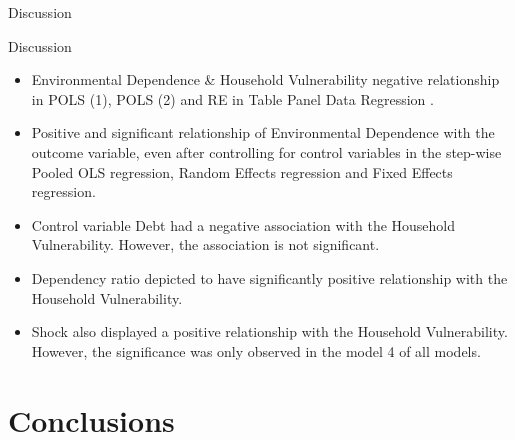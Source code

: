 \documentclass{beamer}
\begin{document}
	\begin{frame}{Discussion}
		\begin{block}{Discussion}
			\scriptsize \begin{itemize}
				\item Environmental Dependence \& Household Vulnerability negative relationship in POLS (1), POLS (2) and RE in Table Panel Data Regression . 
				\item Positive and significant relationship of Environmental Dependence with the outcome variable, even after controlling for control variables in the step-wise Pooled OLS regression, Random Effects regression and Fixed Effects regression.
				\item Control variable Debt had a negative association with the Household Vulnerability. However, the association is not significant.
				\item Dependency ratio depicted to have significantly positive relationship with the Household Vulnerability.
				\item Shock also displayed a positive relationship with the Household Vulnerability. However, the significance was only observed in the model 4 of all models. 
				\end{itemize} 
		\end{block}
	\end{frame}
	\section{Conclusions }
	
\end{document}
